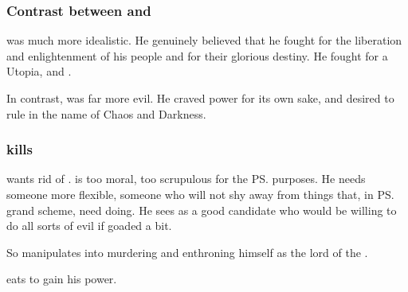 \subsubsection{Contrast between \Damiarch and \Morcariel}
\Damiarch was much more idealistic. 
He genuinely believed that he fought for the liberation and enlightenment of his people and for their glorious destiny. 
He fought for a Utopia, and . 

In contrast, \Morcariel was far more evil. 
He craved power for its own sake, and desired to rule in the name of Chaos and Darkness. 






\subsubsection{\Morcariel kills \Damiarch}
\Daggerrain{} wants rid of \Damiarch. 
\Damiarch{} is too moral, too scrupulous for the \ps{\banelord}{} purposes. 
He needs someone more flexible, someone who will not shy away from things that, in \ps{\Daggerrain}{} grand scheme, need doing. 
He sees \Morcariel as a good candidate who would be willing to do all sorts of evil if goaded a bit. 

So \Daggerrain{} manipulates \Morcariel into murdering \Damiarch{} and enthroning himself as the lord of the \resphain. 

\Morcariel eats \Damiarch{} to gain his power. 


